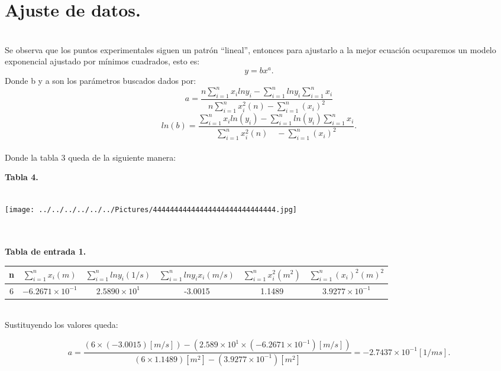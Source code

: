 \documentclass[10pt,a4paper]{article}
\begin{document}
\section*{Ajuste de datos.}\\

Se observa que los puntos experimentales siguen un patr\'{o}n “lineal”, entonces para ajustarlo a la mejor ecuaci\'{o}n ocuparemos un modelo exponencial ajustado por m\'{i}nimos cuadrados, esto es:
\[ y=b{ x }^{ a }.\]
Donde b y a son los par\'{a}metros buscados dados por:
\[a=\frac { n\sum _{ i=1 }^{ n }{ { x }_{ i }ln{ y }_{ i } } -\sum _{ i=1 }^{ n }{ ln{ y }_{ i } } \sum _{ i=1 }^{ n }{ { x }_{ i } }  }{ n\sum _{ i=1 }^{ n }{ { x }_{ i }^{ 2 } } (n)-\sum _{ i=1 }^{ n }{ { \left( { x }_{ i } \right)  }^{ 2 } }  } \]
\[ln(b)=\frac { \sum _{ i=1 }^{ n }{ { x }_{ i }ln({ y }_{ i })- } \sum _{ i=1 }^{ n }{ ln({ y }_{ i })\sum _{ i=1 }^{ n }{ { x }_{ i } }  }  }{ \sum _{ i=1 }^{ n }{ { x }_{ i }^{ 2 }(n)\quad -\sum _{ i=1 }^{ n }{ { \left( { x }_{ i } \right)  }^{ 2 } }  }  } . \]
\\
Donde la tabla 3 queda de la siguiente manera:
\\
\medskip
\begin{figure 2}
\caption{\textbf{Tabla 4.}}
\\
\centering
\texttt{[image: ../../../../../../Pictures/44444444444444444444444444444.jpg]} 
\\
\end{figure 2}
\\
\medskip
\medskip
\\
\textbf{Tabla de entrada 1.}
\\
\begin{figure 6}
\centering
\begin{tabular}{|c|c|c|c|c|c|}
\hline 
n&$\sum _{ i=1 }^{ n }{ { x }_{ i } } (m)$ & $\sum _{ i=1 }^{ n }{ { ln y }_{ i } }(1/s)$ & $ \sum _{ i=1 }^{ n }{ {ln y }_{ i } } { x }_{ i }(m/s)$ & $\sum _{ i=1 }^{ n }{ { x }_{ i }^{ 2 } }({ m }^{ 2 })$& $\sum _{ i=1 }^{ n }{ { \left( { x }_{ i } \right)  }^{ 2 }{ (m) }^{ 2 } }$ \\ 
\hline 
6&$ -6.2671\times { 10 }^{ -1 } $& $2.5890\times { 10 }^{ 1 }$ & -3.0015 & 1.1489 & $3.9277\times { 10 }^{ -1 }$ \\ 
\hline 
\end{tabular}
\end{figure 6} 
\\
Sustituyendo los valores queda:

\[ a=\frac { (6\times (-3.0015)\left[ { m }/{ s } \right] )-(2.589\times { 10 }^{ 1 }\times (-6.2671\times { 10 }^{ -1 })\left[ { m }/{ s } \right] ) }{ (6\times 1.1489)\left[ { m }^{ 2 } \right] -(3.9277\times { 10 }^{ -1 })\left[ { m }^{ 2 } \right]  } =-2.7437\times { 10 }^{ -1 }\left[ { 1 }/{ ms } \right] .\]
\end{document}
